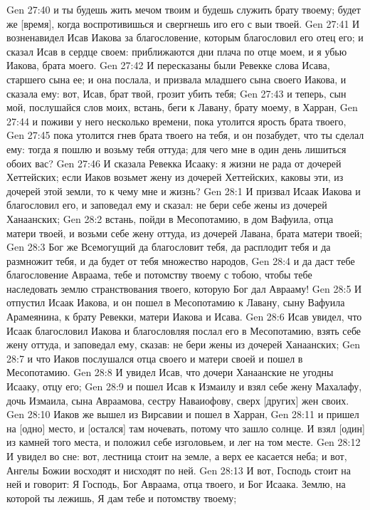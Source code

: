 Gen 27:40  и ты будешь жить мечом твоим и будешь служить брату твоему; будет же [время], когда воспротивишься и свергнешь иго его с выи твоей.
Gen 27:41  И возненавидел Исав Иакова за благословение, которым благословил его отец его; и сказал Исав в сердце своем: приближаются дни плача по отце моем, и я убью Иакова, брата моего.
Gen 27:42  И пересказаны были Ревекке слова Исава, старшего сына ее; и она послала, и призвала младшего сына своего Иакова, и сказала ему: вот, Исав, брат твой, грозит убить тебя;
Gen 27:43  и теперь, сын мой, послушайся слов моих, встань, беги к Лавану, брату моему, в Харран,
Gen 27:44  и поживи у него несколько времени, пока утолится ярость брата твоего,
Gen 27:45  пока утолится гнев брата твоего на тебя, и он позабудет, что ты сделал ему: тогда я пошлю и возьму тебя оттуда; для чего мне в один день лишиться обоих вас?
Gen 27:46  И сказала Ревекка Исааку: я жизни не рада от дочерей Хеттейских; если Иаков возьмет жену из дочерей Хеттейских, каковы эти, из дочерей этой земли, то к чему мне и жизнь?
Gen 28:1  И призвал Исаак Иакова и благословил его, и заповедал ему и сказал: не бери себе жены из дочерей Ханаанских;
Gen 28:2  встань, пойди в Месопотамию, в дом Вафуила, отца матери твоей, и возьми себе жену оттуда, из дочерей Лавана, брата матери твоей;
Gen 28:3  Бог же Всемогущий да благословит тебя, да расплодит тебя и да размножит тебя, и да будет от тебя множество народов,
Gen 28:4  и да даст тебе благословение Авраама, тебе и потомству твоему с тобою, чтобы тебе наследовать землю странствования твоего, которую Бог дал Аврааму!
Gen 28:5  И отпустил Исаак Иакова, и он пошел в Месопотамию к Лавану, сыну Вафуила Арамеянина, к брату Ревекки, матери Иакова и Исава.
Gen 28:6  Исав увидел, что Исаак благословил Иакова и благословляя послал его в Месопотамию, взять себе жену оттуда, и заповедал ему, сказав: не бери жены из дочерей Ханаанских;
Gen 28:7  и что Иаков послушался отца своего и матери своей и пошел в Месопотамию.
Gen 28:8  И увидел Исав, что дочери Ханаанские не угодны Исааку, отцу его;
Gen 28:9  и пошел Исав к Измаилу и взял себе жену Махалафу, дочь Измаила, сына Авраамова, сестру Наваиофову, сверх [других] жен своих.
Gen 28:10  Иаков же вышел из Вирсавии и пошел в Харран,
Gen 28:11  и пришел на [одно] место, и [остался] там ночевать, потому что зашло солнце. И взял [один] из камней того места, и положил себе изголовьем, и лег на том месте.
Gen 28:12  И увидел во сне: вот, лестница стоит на земле, а верх ее касается неба; и вот, Ангелы Божии восходят и нисходят по ней.
Gen 28:13  И вот, Господь стоит на ней и говорит: Я Господь, Бог Авраама, отца твоего, и Бог Исаака. Землю, на которой ты лежишь, Я дам тебе и потомству твоему;
